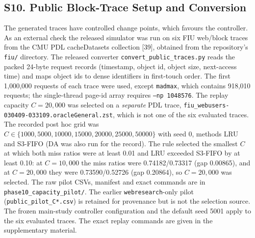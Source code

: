 \documentclass[journal,onecolumn]{IEEEtran}
\begin{document}
\subsection*{S10. Public Block-Trace Setup and Conversion}
The generated traces have controlled change points, which favours the
controller. As an external check the released simulator was run on six FIU
web/block traces from the CMU PDL cacheDatasets collection [39], obtained from
the repository's \texttt{fiu/} directory. The released converter
\texttt{convert\_public\_traces.py} reads the packed 24-byte request records
(timestamp, object id, object size, next-access time) and maps object ids to
dense identifiers in first-touch order. The first 1,000,000 requests of each
trace were used, except \texttt{madmax}, which contains 918,010 requests; the
single-thread page-id array requires \texttt{--np 1048576}. The replay
capacity $C = 20{,}000$ was selected on a \emph{separate} PDL trace,
\texttt{fiu\_webusers-030409-033109.oracleGeneral.zst}, which is not one of the
six evaluated traces. The recorded post hoc grid was $C \in \{1000, 5000, 10000,
15000, 20000, 25000, 50000\}$ with seed 0, methods LRU and S3-FIFO (DA was also
run for the record). The rule selected the smallest $C$ at which both miss
ratios were at least 0.01 and LRU exceeded S3-FIFO by at least 0.10: at
$C = 10{,}000$ the miss ratios were 0.74182/0.73317 (gap 0.00865), and at
$C = 20{,}000$ they were 0.73590/0.52726 (gap 0.20864), so $C = 20{,}000$ was
selected. The raw pilot CSVs, manifest and exact commands are in
\texttt{phase10\_capacity\_pilot/}. The earlier \texttt{webresearch}-only pilot
(\texttt{public\_pilot\_C*.csv}) is retained for provenance but is not the
selection source. The frozen main-study controller configuration and the
default seed 5001 apply to the six evaluated traces. The exact replay commands
are given in the supplementary material.
\end{document}
